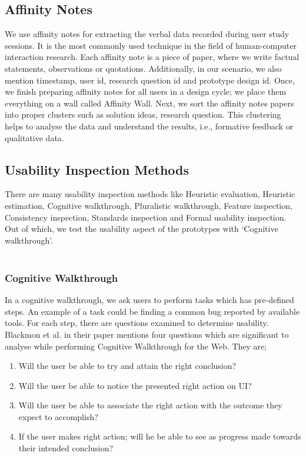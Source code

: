 \subsection{Affinity Notes}

We use affinity notes \cite{affinity} for extracting the verbal data recorded during user study sessions. It is the most commonly used technique in the field of human-computer interaction research. Each affinity note is a piece of paper, where we write factual statements, observations or quotations. Additionally, in our scenario, we also mention timestamp, user id, research question id and prototype design id. Once, we finish preparing affinity notes for all users in a design cycle; we place them everything on a wall called Affinity Wall. Next, we sort the affinity notes papers into proper clusters such as solution ideas, research question. This clustering helps to analyse the data and understand the results, i.e., formative feedback or qualitative data. \\


\subsection{Usability Inspection Methods}

There are many usability inspection methods \cite{nielsen1994usability} like Heuristic evaluation, Heuristic estimation, Cognitive walkthrough, Pluralistic walkthrough, Feature inspection, Consistency inspection, Standards inspection and Formal usability inspection. Out of which, we test the usability aspect of the prototypes with ‘Cognitive walkthrough’. \\ \\

\subsubsection{Cognitive Walkthrough}

In a cognitive walkthrough, we ask users to perform tasks which has pre-defined steps. An example of a task could be finding a common bug reported by available tools. For each step, there are questions examined to determine usability. Blackmon et al. in their paper \cite{blackmon2002cognitive} mentions four questions which are significant to analyse while performing Cognitive Walkthrough for the Web. They are; \\

\begin{enumerate}
\item Will the user be able to try and attain the right conclusion?
\item Will the user be able to notice the presented right action on UI?
\item Will the user be able to associate the right action with the outcome they expect to accomplish?
\item If the user makes right action; will he be able to see as progress made towards their intended conclusion?
\end{enumerate}

